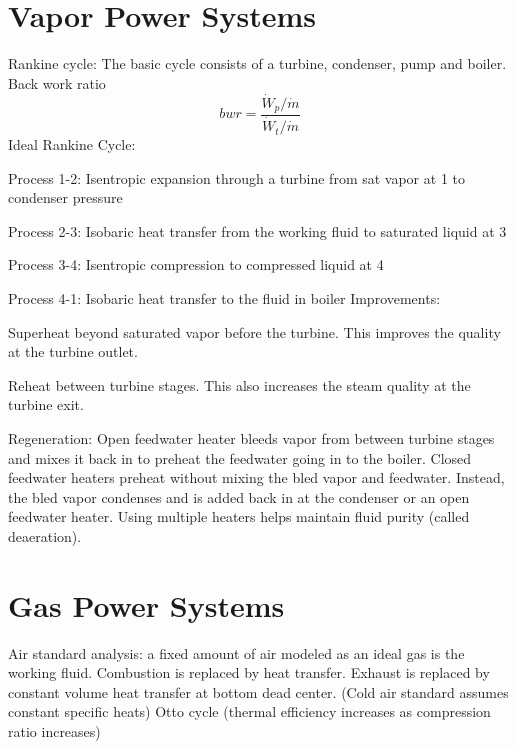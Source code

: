 \documentclass[paper=letter, fontsize=11pt]{scrartcl}
\numberwithin{equation}{section}        %
\numberwithin{figure}{section}          %
\numberwithin{table}{section}               %
\begin{document}
\newpage
\section{Vapor Power Systems}

Rankine cycle: The basic cycle consists of a turbine, condenser, pump and boiler.
\newline
\newline
Back work ratio
\begin{equation}
    bwr = \frac{\dot W_p/\dot m}{\dot W_t/\dot m}
\end{equation}
\newline
\newline
Ideal Rankine Cycle:

Process 1-2: Isentropic expansion through a turbine from sat vapor at 1 to condenser pressure

Process 2-3: Isobaric heat transfer from the working fluid to saturated liquid at 3

Process 3-4: Isentropic compression to compressed liquid at 4

Process 4-1: Isobaric heat transfer to the fluid in boiler
\newline
\newline
Improvements: 

Superheat beyond saturated vapor before the turbine. This improves the quality at the turbine outlet.

Reheat between turbine stages. This also increases the steam quality at the turbine exit.

Regeneration: Open feedwater heater bleeds vapor from between turbine stages and mixes it back in to preheat the feedwater going in to the boiler. Closed feedwater heaters preheat without mixing the bled vapor and feedwater. Instead, the bled vapor condenses and is added back in at the condenser or an open feedwater heater. Using multiple heaters helps maintain fluid purity (called deaeration).


\newpage
\section{Gas Power Systems}

Air standard analysis: a fixed amount of air modeled as an ideal gas is the working fluid. Combustion is replaced by heat transfer. Exhaust is replaced by constant volume heat transfer at bottom dead center. (Cold air standard assumes constant specific heats)
\newline
\newline
Otto cycle (thermal efficiency increases as compression ratio increases)
\end{document}
